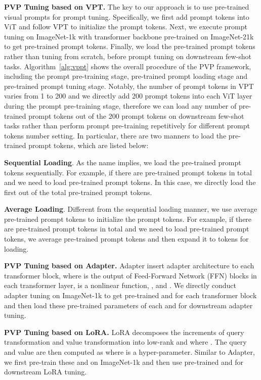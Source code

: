 \documentclass[10pt,journal,letterpaper,compsoc]{IEEEtran}
\newcommand{\myPara}[1]{\vspace{10pt}\noindent\textbf{#1.}\quad}
\begin{document}
\myPara{PVP Tuning based on VPT}
The key to our approach is to use pre-trained visual prompts for prompt tuning. Specifically, we first add prompt tokens into ViT and follow VPT to initialize the prompt tokens. Next, we execute prompt tuning on ImageNet-1k with transformer backbone pre-trained on ImageNet-21k to get pre-trained prompt tokens. Finally, we load the pre-trained prompt tokens rather than tuning from scratch, before prompt tuning on downstream few-shot tasks. Algorithm~\ref{alg:vppt} shows the overall procedure of the PVP framework, including the prompt pre-training stage, pre-trained prompt loading stage and pre-trained prompt tuning stage. Notably, the number of prompt tokens in VPT varies from 1 to 200 and we directly add 200 prompt tokens into each ViT layer during the prompt pre-training stage, therefore we can load any number of pre-trained prompt tokens out of the 200 prompt tokens on downstream few-shot tasks rather than perform prompt pre-training repetitively for different prompt tokens number setting. In particular, there are two manners to load the pre-trained prompt tokens, which are listed below:

\textbf{Sequential Loading}. As the name implies, we load the pre-trained prompt tokens sequentially. For example, if there are  pre-trained prompt tokens in total and we need to load  pre-trained prompt tokens. In this case, we directly load the first  out of the total  pre-trained prompt tokens.

\textbf{Average Loading}. Different from the sequential loading manner, we use average pre-trained prompt tokens to initialize the prompt tokens. For example, if there are  pre-trained prompt tokens in total and we need to load  pre-trained prompt tokens, we average  pre-trained prompt tokens and then expand it to  tokens for loading.

\myPara{PVP Tuning based on Adapter}
Adapter insert adapter architecture to each transformer block,  where  is the output of Feed-Forward Network (FFN) blocks in each transformer layer,  is a nonlinear function, ,  and . We directly conduct adapter tuning on ImageNet-1k to get pre-trained  and  for each transformer block and then load these pre-trained parameters of each  and  for downstream adapter tuning.


\myPara{PVP Tuning based on LoRA}
LoRA decomposes the increments of query transformation  and value transformation  into low-rank  and  where . The query and value are then computed as  where  is a hyper-parameter. Similar to Adapter, we first pre-train these  and  on ImageNet-1k and then use pre-trained  and  for downstream LoRA tuning.
\end{document}
